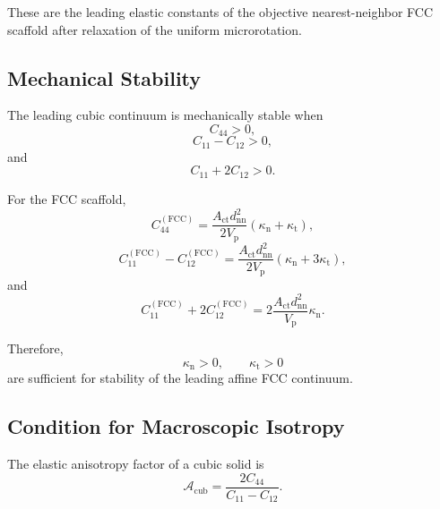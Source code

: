 These are the leading elastic constants of the objective nearest-neighbor FCC scaffold after relaxation of the uniform microrotation.

\subsection{Mechanical Stability}

The leading cubic continuum is mechanically stable when
\begin{equation}
    C_{44} > 0,
\end{equation}
\begin{equation}
    C_{11} - C_{12} > 0,
\end{equation}
and
\begin{equation}
    C_{11} + 2C_{12} > 0.
\end{equation}

For the FCC scaffold,
\begin{equation}
    C_{44}^{(\mathrm{FCC})} = \frac{ A_{\mathrm{ct}}d_{\mathrm{nn}}^2 }{ 2V_{\mathrm{p}} } \left( \kappa_{\mathrm{n}} + \kappa_{\mathrm{t}} \right),
\end{equation}
\begin{equation}
    C_{11}^{(\mathrm{FCC})} - C_{12}^{(\mathrm{FCC})} = \frac{ A_{\mathrm{ct}}d_{\mathrm{nn}}^2 }{ 2V_{\mathrm{p}} } \left( \kappa_{\mathrm{n}} + 3\kappa_{\mathrm{t}} \right),
\end{equation}
and
\begin{equation}
    C_{11}^{(\mathrm{FCC})} + 2C_{12}^{(\mathrm{FCC})} = 2 \frac{ A_{\mathrm{ct}}d_{\mathrm{nn}}^2 }{ V_{\mathrm{p}} } \kappa_{\mathrm{n}}.
\end{equation}

Therefore,
\begin{equation}
    \boxed{ \kappa_{\mathrm{n}} > 0, \qquad \kappa_{\mathrm{t}} > 0 }
\end{equation}
are sufficient for stability of the leading affine FCC continuum.

\subsection{Condition for Macroscopic Isotropy}

The elastic anisotropy factor of a cubic solid is
\begin{equation}
    \boxed{ \mathcal{A}_{\mathrm{cub}} = \frac{ 2C_{44} }{ C_{11}-C_{12} }. }
\end{equation}

